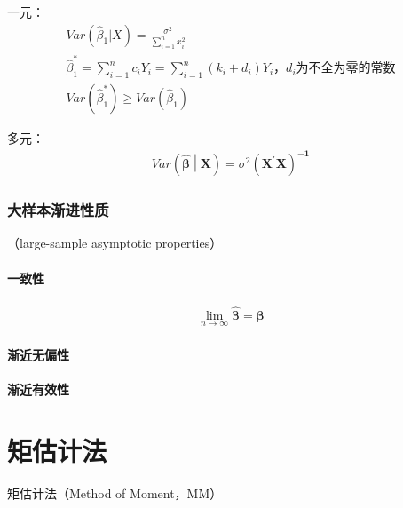 \documentclass[12pt]{book}
\begin{document}
一元：
\begin{gather*}
    Var(\hat{\beta}_1|X)=\frac{\sigma^2}{\sum_{i=1}^{n}x_i^2} \\
    {\hat{\beta}}_1^\ast=\sum_{i=1}^{n}{c_iY_i}=\sum_{i=1}^{n}{\left(k_i+d_i\right)Y_i}，d_i\text{为不全为零的常数}\\
    Var(\hat{\beta}_1^\ast)\geqslant Var(\hat{\beta}_1)
\end{gather*}


多元：
\begin{gather*}
    Var\left(\hat{\bm{\beta}}\middle|\bm{X}\right)=\sigma^2\left(\bm{X}^\prime\bm{X}\right)^{-\bm{1}}
\end{gather*}


\subsubsection{大样本渐进性质}



（large-sample asymptotic properties）
\paragraph{一致性}

\begin{gather*}
    \lim_{n\rightarrow\infty}{\hat{\bm{\beta}}} = \bm{\beta}
\end{gather*}


\paragraph{渐近无偏性}

\paragraph{渐近有效性}


















\section{矩估计法}





矩估计法（Method of Moment，MM）
\end{document}
